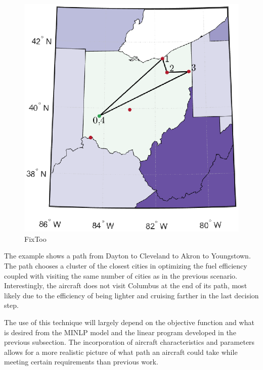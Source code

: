 \begin{figure}[H]
    \centering
    \includegraphics{Thesis/Method_II/fmin3000_negF.eps}
    \caption{FixToo}
    \label{fig:weightedObj}
\end{figure}
The example shows a path from Dayton to Cleveland to Akron to Youngstown. The path chooses a cluster of the closest cities in optimizing the fuel efficiency coupled with visiting the same number of cities as in the previous scenario. Interestingly, the aircraft does not visit Columbus at the end of its path, most likely due to the efficiency of being lighter and cruising farther in the last decision step.\par
The use of this technique will largely depend on the objective function and what is desired from the MINLP model and the linear program developed in the previous subsection. The incorporation of aircraft characteristics and parameters allows for a more realistic picture of what path an aircraft could take while meeting certain requirements than previous work. 


